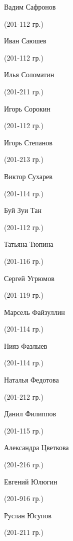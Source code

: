 \begin{multicols}{2}
\begin{small}
\begin{enumerate*}
	\item Вадим Сафронов\begin{tiny} (201-112 гр.)\end{tiny}
	\item Иван Саюшев\begin{tiny} (201-112 гр.)\end{tiny}
	\item Илья Соломатин\begin{tiny} (201-211 гр.)\end{tiny}
	\item Игорь Сорокин\begin{tiny} (201-112 гр.)\end{tiny}
	\item Игорь Степанов\begin{tiny} (201-213 гр.)\end{tiny}
	\item Виктор Сухарев\begin{tiny} (201-114 гр.)\end{tiny}
	\item Буй Зуи Тан\begin{tiny} (201-112 гр.)\end{tiny}
	\item Татьяна Тюпина\begin{tiny} (201-116 гр.)\end{tiny}
	\item Сергей Угрюмов\begin{tiny} (201-119 гр.)\end{tiny}
	\item Марсель Файзуллин\begin{tiny} (201-114 гр.)\end{tiny}
	\item Нияз Фазлыев\begin{tiny} (201-114 гр.)\end{tiny}
	\item Наталья Федотова\begin{tiny} (201-212 гр.)\end{tiny}
	\item Данил Филиппов\begin{tiny} (201-115 гр.)\end{tiny}
	\item Александра Цветкова\begin{tiny} (201-216 гр.)\end{tiny}
	\item Евгений Юлюгин\begin{tiny} (201-916 гр.)\end{tiny}
	\item Руслан Юсупов\begin{tiny} (201-211 гр.)\end{tiny}
\end{enumerate*}
\end{small}
\end{multicols}